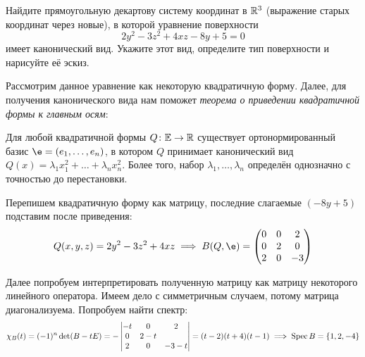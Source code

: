 \begin{condition}
    Найдите прямоугольную декартову систему координат в $\mathbb{R}^3$ (выражение старых координат через новые), в которой уравнение поверхности
    \[
        2y^2 - 3z^2 + 4xz - 8y + 5 = 0
    \]
    имеет канонический вид. Укажите этот вид, определите тип поверхности и нарисуйте её эскиз.
\end{condition}

Рассмотрим данное уравнение как некоторую квадратичную форму. Далее, для получения канонического вида нам поможет \textit{теорема о приведении квадратичной формы к главным осям}:

\begin{theorem}
    Для любой квадратичной формы $Q \colon \mathbb{E} \to \mathbb{R}$ существует ортонормированный базис $\e = (e_1, \ldots, e_n)$, в котором $Q$ принимает канонический вид $Q(x) = \lambda_1 x_1^2 + \ldots + \lambda_n x_n^2$. Более того, набор $\lambda_1, \ldots, \lambda_n$ определён однозначно с точностью до перестановки.
\end{theorem}

Перепишем квадратичную форму как матрицу, последние слагаемые $(- 8y + 5)$ подставим после приведения:
\[
    Q(x, y, z) = 2y^2 - 3z^2 + 4xz
    \implies
    B(Q, \e) =
    \begin{pmatrix}
        0 & 0 & 2  \\
        0 & 2 & 0  \\
        2 & 0 & -3
    \end{pmatrix}
\]

Далее попробуем интерпретировать полученную матрицу как матрицу некоторого линейного оператора. Имеем дело с симметричным случаем, потому матрица диагонализуема. Попробуем найти спектр:
\[
    \chi_B(t) = (-1)^n \det(B -tE) = -
    \begin{vmatrix}
        -t & 0     & 2      \\
        0  & 2 - t &        \\
        2  & 0     & -3 - t
    \end{vmatrix}
    = (t - 2)(t + 4)(t - 1) \implies \operatorname{Spec} B = \{1, 2, -4\}
\]

